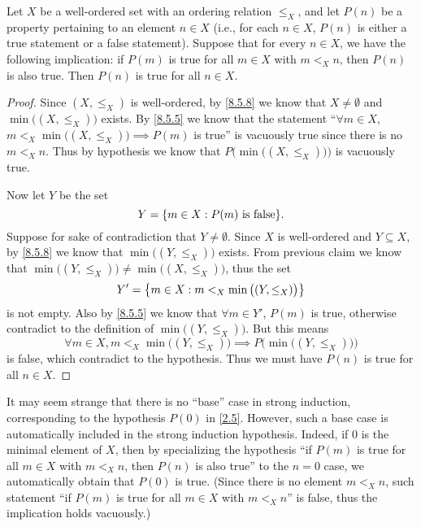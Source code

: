 \begin{prop}\label{8.5.10}
  Let \(X\) be a well-ordered set with an ordering relation \(\leq_X\), and let \(P(n)\) be a property pertaining to an element \(n \in X\)
  (i.e., for each \(n \in X\), \(P(n)\) is either a true statement or a false statement).
  Suppose that for every \(n \in X\), we have the following implication:
  if \(P(m)\) is true for all \(m \in X\) with \(m <_X n\), then \(P(n)\) is also true.
  Then \(P(n)\) is true for all \(n \in X\).
\end{prop}

\begin{proof}
  Since \((X, \leq_X)\) is well-ordered, by \cref{8.5.8} we know that \(X \neq \emptyset\) and \(\min\big((X, \leq_X)\big)\) exists.
  By \cref{8.5.5} we know that the statement ``\(\forall m \in X\), \(m <_X \min\big((X, \leq_X)\big) \implies P(m)\) is true'' is vacuously true since there is no \(m <_X n\).
  Thus by hypothesis we know that \(P\Big(\min\big((X, \leq_X)\big)\Big)\) is vacuously true.

  Now let \(Y\) be the set
  \[
    Y = \set{m \in X : P(m) \text{ is false}}.
  \]
  Suppose for sake of contradiction that \(Y \neq \emptyset\).
  Since \(X\) is well-ordered and \(Y \subseteq X\), by \cref{8.5.8} we know that \(\min\big((Y, \leq_X)\big)\) exists.
  From previous claim we know that \(\min\big((Y, \leq_X)\big) \neq \min\big((X, \leq_X)\big)\), thus the set
  \[
    Y' = \left\lbrace m \in X : m <_X \min\big((Y, \leq_X)\big)\right\rbrace
  \]
  is not empty.
  Also by \cref{8.5.5} we know that \(\forall m \in Y'\), \(P(m)\) is true, otherwise contradict to the definition of \(\min\big((Y, \leq_X)\big)\).
  But this means
  \[
    \forall m \in X, m <_X \min\big((Y, \leq_X)\big) \implies P\Big(\min\big((Y, \leq_X)\big)\Big)
  \]
  is false, which contradict to the hypothesis.
  Thus we must have \(P(n)\) is true for all \(n \in X\).
\end{proof}

\begin{rmk}\label{8.5.11}
  It may seem strange that there is no ``base'' case in strong induction, corresponding to the hypothesis \(P(0)\) in \cref{2.5}.
  However, such a base case is automatically included in the strong induction hypothesis.
  Indeed, if \(0\) is the minimal element of \(X\), then by specializing the hypothesis ``if \(P(m)\) is true for all \(m \in X\) with \(m <_X n\), then \(P(n)\) is also true'' to the \(n = 0\) case, we automatically obtain that \(P(0)\) is true.
  (Since there is no element \(m <_X n\), such statement ``if \(P(m)\) is true for all \(m \in X\) with \(m <_X n\)'' is false, thus the implication holds vacuously.)
\end{rmk}

